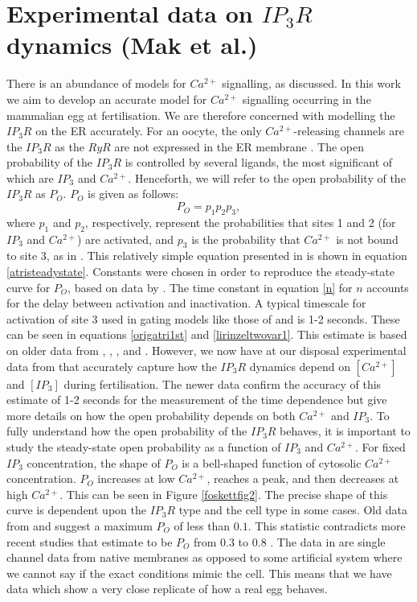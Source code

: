 
\chapter{Experimental data on ${IP_3R}$ dynamics (Mak et al.)}

There is an abundance of models for $Ca^{2+}$ signalling, as discussed. In this work we aim to develop an accurate model for $Ca^{2+}$ signalling occurring in the mammalian egg at fertilisation. We are therefore concerned with modelling the $IP_3R$ on the ER accurately. For an oocyte, the only $Ca^{2+}$-releasing channels are the $IP_3R$ as the $RyR$ are not expressed in the ER membrane \cite{dupont}. The open probability of the $IP_3R$ is controlled by several ligands, the most significant of which are $IP_3$ and $Ca^{2+}$. Henceforth, we will refer to the open probability of the $IP_3R$ as $P_O$. $P_O$ is given as follows:
\begin{equation}
    P_O=p_1p_2p_3,\label{openprob}
\end{equation}
where $p_1$ and $p_2$, respectively, represent the probabilities that sites 1 and 2 (for $IP_3$ and $Ca^{2+}$) are activated, and $p_3$ is the probability that $Ca^{2+}$ is not bound to site 3, as in . This relatively simple equation presented in  is shown in equation \eqref{atristeadystate}. Constants were chosen in order to reproduce the steady-state curve for $P_O$, based on data by . The time constant in equation \eqref{n} for $n$ accounts for the delay between activation and inactivation. A typical timescale {for activation of site 3} used in gating models like those of  and  is 1-2 seconds. These can be seen in equations \eqref{origatri1st} and \eqref{lirinzeltwovar1}. This estimate is based on {older} data from , , , and . However, we now have at our disposal experimental data from  {that accurately capture how the $IP_3R$ dynamics depend on $[Ca^{2+}]$ and $[IP_3]$ during fertilisation}. The newer data confirm the accuracy of this estimate of 1-2 seconds for the measurement of the time dependence but give more details on how the open probability depends on both $Ca^{2+}$ and $IP_3$. To fully understand how the open probability of the $IP_3R$ behaves, it is important to study the steady-state open probability as a function of $IP_3$ and $Ca^{2+}$. For fixed $IP_3$ concentration, the shape of $P_O$ is a bell-shaped function of cytosolic $Ca^{2+}$ concentration. $P_O$ increases at low $Ca^{2+}$, reaches a peak, and then decreases at high $Ca^{2+}$. This can be seen in Figure \ref{foskettfig2}. The precise shape of this curve is dependent upon the $IP_3R$ type and the cell type in some cases. Old data from  and  suggest a maximum $P_O$ of less than $0.1$. This statistic contradicts more recent studies that estimate to be $P_O$ from $0.3$ to $0.8$ \cite{Mak1998}. The data in  are single channel data from native membranes as opposed to some artificial system where we cannot say if the exact conditions mimic the cell. This means that we have data which show a very close replicate of how a real egg behaves.

